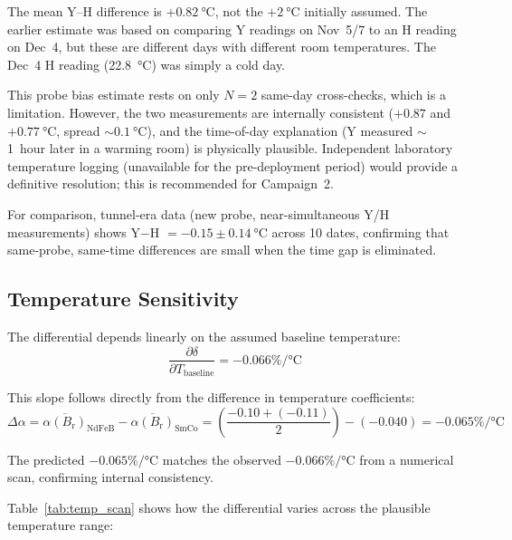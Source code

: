 \documentclass[11pt,letterpaper]{article}
\newcommand{\Br}{B_\mathrm{r}}
\newcommand{\alphar}{\alpha(\Br)}
\begin{document}
The mean Y--H difference is $+\SI{0.82}{\celsius}$, not the $+\SI{2}{\celsius}$
initially assumed. The earlier estimate was based on comparing Y readings on
Nov~5/7 to an H reading on Dec~4, but these are different days with
different room temperatures. The Dec~4 H reading (\SI{22.8}{\celsius}) was
simply a cold day.

This probe bias estimate rests on only $N=2$ same-day cross-checks, which
is a limitation. However, the two measurements are internally consistent
($+0.87$ and $+\SI{0.77}{\celsius}$, spread $\sim\SI{0.1}{\celsius}$), and
the time-of-day explanation (Y measured $\sim$1~hour later in a warming room)
is physically plausible. Independent laboratory temperature logging
(unavailable for the pre-deployment period) would provide a definitive
resolution; this is recommended for Campaign~2.

For comparison, tunnel-era data (new probe, near-simultaneous Y/H measurements)
shows Y$-$H $= -0.15\pm\SI{0.14}{\celsius}$ across 10 dates, confirming that
same-probe, same-time differences are small when the time gap is eliminated.

\subsection{Temperature Sensitivity}
\label{sec:temp_sensitivity}

The differential depends linearly on the assumed baseline temperature:
\begin{equation}
    \frac{\partial \delta}{\partial T_\mathrm{baseline}} = -0.066\%/\si{\celsius}
    \label{eq:temp_sensitivity}
\end{equation}

This slope follows directly from the difference in temperature coefficients:
\begin{equation}
    \Delta\alpha = \overline{\alphar}_\mathrm{NdFeB} - \overline{\alphar}_\mathrm{SmCo}
    = \left(\frac{-0.10 + (-0.11)}{2}\right) - (-0.040)
    = -0.065\%/\si{\celsius}
\end{equation}

The predicted $-0.065\%/\si{\celsius}$ matches the observed
$-0.066\%/\si{\celsius}$ from a numerical scan, confirming internal
consistency.

Table~\ref{tab:temp_scan} shows how the differential varies across the
plausible temperature range:
\end{document}

